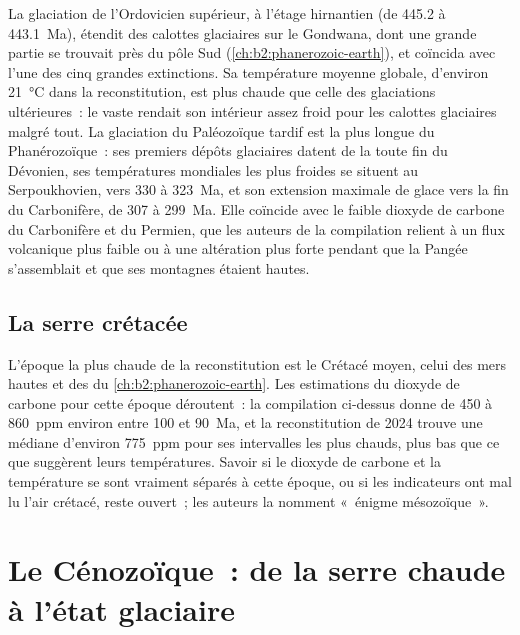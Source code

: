 La glaciation de l'Ordovicien supérieur, à l'étage hirnantien (de 445.2 à \qty{443.1}{Ma}), étendit des calottes glaciaires
sur le Gondwana, dont une grande partie se trouvait près du pôle Sud (\cref{ch:b2:phanerozoic-earth}), et
coïncida avec l'une des cinq grandes extinctions. Sa température moyenne globale, d'environ
\qty{21}{\celsius} dans la reconstitution, est plus chaude que celle des glaciations ultérieures~: le vaste
 rendait son intérieur assez froid pour les calottes glaciaires malgré tout. La glaciation du Paléozoïque tardif est
la plus longue du Phanérozoïque~: ses premiers dépôts glaciaires datent de la toute fin du Dévonien, ses températures
mondiales les plus froides se situent au Serpoukhovien, vers 330 à \qty{323}{Ma}, et son extension maximale de
glace vers la fin du Carbonifère, de 307 à \qty{299}{Ma}. Elle coïncide avec le faible dioxyde de carbone du
Carbonifère et du Permien, que les auteurs de la compilation relient à un flux volcanique plus faible ou à une
altération plus forte pendant que la Pangée s'assemblait et que ses montagnes étaient hautes.

\subsection*{La serre crétacée}

L'époque la plus chaude de la reconstitution est le Crétacé moyen, celui des mers hautes et des
 du \cref{ch:b2:phanerozoic-earth}. Les estimations du dioxyde de carbone pour
cette époque déroutent~: la compilation ci-dessus donne de 450 à \qty{860}{ppm} environ entre 100 et
\qty{90}{Ma}, et la reconstitution de 2024 trouve une médiane d'environ \qty{775}{ppm} pour ses intervalles
les plus chauds, plus bas que ce que suggèrent leurs températures. Savoir si le dioxyde de carbone et la température
se sont vraiment séparés à cette époque, ou si les indicateurs ont mal lu l'air crétacé, reste ouvert~; les auteurs
la nomment «~énigme mésozoïque~».

\section{Le Cénozoïque~: de la serre chaude à l'état glaciaire}\label{sec:b2:deep-time-climate:cenozoic}

